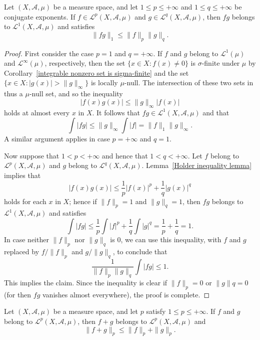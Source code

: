 \begin{proposition}
Let $(X,\mathcal{A},\mu)$ be a measure space, and let $1\leq p\leq+\infty$ and $1\leq q\leq +\infty$ be conjugate exponents. If $f\in\mathcal{L}^p(X,\mathcal{A},\mu)$ and $g\in\mathcal{L}^q(X,\mathcal{A},\mu)$, then $fg$ belongs to $\mathcal{L}^1(X,\mathcal{A},\mu)$ and satisfies
\[\|fg\|_1\leq\|f\|_p\|g\|_q.\]
\end{proposition}
\begin{proof}
First consider the case $p=1$ and $q=+\infty$. If $f$ and $g$ belong to $\mathcal{L}^1(\mu)$ and $\mathcal{L}^\infty(\mu)$, respectively, then the set $\{x\in X:f(x)\neq 0\}$ is $\sigma$-finite under $\mu$ by Corollary~\ref{integrable nonzero set is sigma-finite} and the set $\{x\in X:|g(x)|>\|g\|_{\infty}\}$ is locally $\mu$-null. The intersection of these two sets in thus a $\mu$-null set, and so the inequality
\[|f(x)g(x)|\leq\|g\|_{\infty}|f(x)|\]
holds at almost every $x$ in $X$. It follows that $fg\in\mathcal{L}^1(X,\mathcal{A},\mu)$ and that
\[\int|fg|\leq\|g\|_\infty\int|f|=\|f\|_1\|g\|_\infty.\]
A similar argument applies in case $p=+\infty$ and $q=1$.\par
Now suppose that $1<p<+\infty$ and hence that $1<q<+\infty$. Let $f$ belong to $\mathcal{L}^p(X,\mathcal{A},\mu)$ and $g$ belong to $\mathcal{L}^q(X,\mathcal{A},\mu)$. Lemma~\ref{Holder inequality lemma} implies that
\[|f(x)g(x)|\leq\frac{1}{p}|f(x)|^p+\frac{1}{q}|g(x)|^q\]
holds for each $x$ in $X$; hence if $\|f\|_p=1$ and $\|g\|_q=1$, then $fg$ belongs to $\mathcal{L}^1(X,\mathcal{A},\mu)$ and satisfies
\[\int|fg|\leq\frac{1}{p}\int|f|^p+\frac{1}{q}\int|g|^q=\frac{1}{p}+\frac{1}{q}=1.\]
In case neither $\|f\|_p$ nor $\|g\|_q$ is $0$, we can use this inequality, with $f$ and $g$ replaced by $f/\|f\|_p$ and $g/\|g\|_q$, to conclude that
\[\frac{1}{\|f\|_p\|g\|_q}\int|fg|\leq 1.\]
This implies the claim. Since the inequality is clear if $\|f\|_p=0$ or $\|g\|q=0$ (for then $fg$ vanishes almost everywhere), the proof is complete.
\end{proof}
\begin{proposition}
Let $(X,\mathcal{A},\mu)$ be a measure space, and let $p$ satisfy $1\leq p\leq +\infty$. If $f$ and $g$ belong to $\mathcal{L}^p(X,\mathcal{A},\mu)$, then $f+g$ belongs to $\mathcal{L}^p(X,\mathcal{A},\mu)$ and
\[\|f+g\|_p\leq\|f\|_p+\|g\|_p.\]
\end{proposition}
